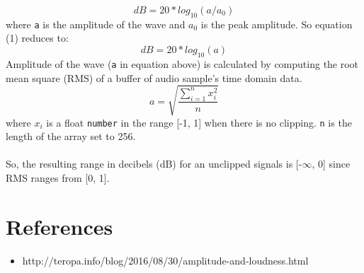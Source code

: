 \documentclass[20pt]{article}
\begin{document}
\begin{equation}
dB = 20 * log_{10}(a / a_{0})
\end{equation}
where \texttt{a} is the amplitude of the wave and $a_0$ is the peak amplitude.
So equation (1) reduces to:
\begin{equation}
dB = 20 * log_{10}(a)
\end{equation}
Amplitude of the wave (\texttt{a} in equation above) is calculated by computing the root mean square (RMS) of a buffer of audio sample's time domain data.
\begin{equation}
a = \sqrt{\frac{\sum_{i=1}^{n}x_i^2}{n}}
\end{equation} 
where $x_i$ is a float \texttt{number} in the range [-1, 1] when there is no clipping. \texttt{n} is the length of the array set to 256.\\
\\
So, the resulting range in decibels (dB) for an unclipped signals is [-$\infty$, 0] since RMS ranges from [0, 1]. 

\section*{References}
\begin{itemize}
\item http://teropa.info/blog/2016/08/30/amplitude-and-loudness.html
\end{itemize}
\end{document}

